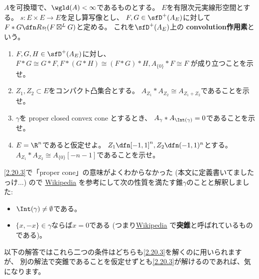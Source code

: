 \documentclass[uplatex,dvipdfmx]{jsarticle}
\begin{document}
\maketitle
\HeaderCommentA
\section{}
\fi



\begin{prob}\label{2.20}
  \(A\)を可換環で、\(\wgld(A)<\infty\)であるものとする。
  \(E\)を有限次元実線形空間とする。
  \(s:E\times E \to E\)を足し算写像とし、
  \(F,G\in \sfD^+(A_E)\)に対して
  \(F*G \dfn Rs_!(F\boxtimes^LG)\)と定める。
  これを\(\sfD^+(A_E)\)上の
  \textbf{convolution作用素}という。
  \begin{enumerate}
    \item \label{2.20.1}
    \(F,G,H\in \sfD^+(A_E)\)に対し、
    \(F*G\cong G*F, F*(G*H)\cong (F*G)*H, A_{\{0\}}*F\cong F\)
    が成り立つことを示せ。
    \item \label{2.20.2}
    \(Z_1,Z_2\subset E\)をコンパクト凸集合とする。
    \(A_{Z_1}*A_{Z_2}\cong A_{Z_1+Z_2}\)であることを示せ。
    \item \label{2.20.3}
    \(\gamma\)を proper closed convex cone とするとき、
    \(A_{\gamma}*A_{\Int(\gamma)} = 0\)であることを示せ。
    \item \label{2.20.4}
    \(E = \R^n\)であると仮定せよ。
    \(Z_1 \dfn [-1,1]^n, Z_2\dfn (-1,1)^n\)とする。
    \(A_{Z_1}*A_{Z_2}\cong A_{\{0\}}[-n-1]\)であることを示せ。
  \end{enumerate}
\end{prob}

\begin{rem*}
  \ref{2.20.3}で「proper cone」の意味がよくわからなかった
  (本文に定義書いてましたっけ...) ので
  \href{https://ja.wikipedia.org/wiki/%E5%87%B8%E9%8C%90}{Wikipedia}
  を参考にして次の性質を満たす錐\(\gamma\)のことと解釈しました:
  \begin{itemize}
    \item \(\Int(\gamma) \neq \emptyset\)である。
    \item \(\{x,-x\}\in \gamma\)ならば\(x=0\)である
    (つまり\href{https://ja.wikipedia.org/wiki/%E5%87%B8%E9%8C%90}{Wikipedia}
    で\textbf{突錐}と呼ばれているものである)。
  \end{itemize}
  以下の解答ではこれら二つの条件はどちらも\ref{2.20.3}を解くのに用いられますが、
  別の解法で突錐であることを仮定せずとも\ref{2.20.3}が解けるのであれば、気になります。
\end{rem*}
\end{document}
